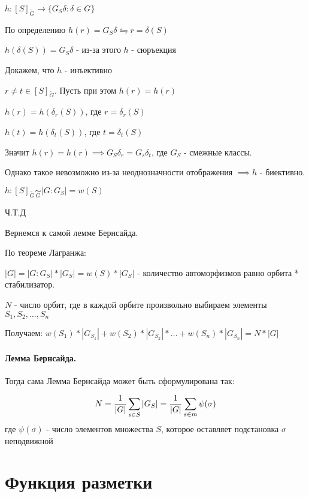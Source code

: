 \documentclass{report}
\begin{document}
$h:[S]_{\tilde{G}} \to \{G_{S}\delta:\delta \in G\} $


По определению $h(r) = G_{S}\delta \leftrightharpoons r = \delta(S)$ 

$h(\delta(S)) = G_{S}\delta$ - из-за этого $h$ - сюръекция

Докажем, что  $h$ - инъективно

$r \neq t \in [S]_{\tilde{G}}$. Пусть при этом $h(r) = h(r)$

\medskip

 $h(r) = h(\delta_{r}(S))$, где $r = \delta_{r}(S)$
 
 $h(t) = h(\delta_{t}(S))$, где $t = \delta_{t}(S)$

 \medskip

 Значит $h(r) = h(r) \implies G_{S}\delta_{r} = G_{s}\delta_{t}$, где $G_{S}$ - смежные классы.

 Однако такое невозможно из-за неоднозначности отображения $\implies h$ - биективно.

 $h: [S]_{\tilde{G}} \underset{G}{\sim} |G:G_{S}| = w(S)$ 

 Ч.Т.Д

 Вернемся к самой лемме Бернсайда.

 По теореме Лагранжа:

 $|G| = |G:G_{S}|*|G_{S}| = w(S)*|G_{S}|$ - количество автоморфизмов равно орбита * стабилизатор.

 \medskip

 $N$ - число орбит, где в каждой орбите произвольно выбираем элементы  $S_1,S_2,\ldots,S_{n}$ 

 Получаем: $w(S_1)*|G_{S_1}| + w(S_2)*|G_{S_2}| * \ldots + w(S_{n})*|G_{S_{n}}| = N*|G|$ 

 \medskip

 \paragraph*{Лемма Бернсайда.}
 Тогда сама Лемма Бернсайда может быть сформулирована так:

 \[
	 N = \frac{1}{|G|} \sum_{s \in S}|G_{S}| = \frac{1}{|G|}\sum_{s \in m}\psi(\sigma) \\
 \] 
где $\psi(\sigma)$ - число элементов множества  $S$, которое оставляет подстановка
$\sigma$ неподвижной

\newpage

\section{Функция разметки}
\end{document}
